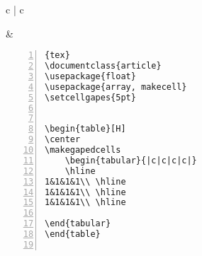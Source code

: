 \begin{tabular}{c | c}
\begin{minipage}[m]{0.4\textwidth}
\end{minipage}
&
\begin{minipage}[m]{0.55\textwidth}
\begin{lstlisting}[numberstyle=\zebra{green!15}{yellow!15},numbers=left,basicstyle=\footnotesize]{tex}
\documentclass{article}
\usepackage{float}
\usepackage{array, makecell}
\setcellgapes{5pt}


\begin{table}[H]
\center
\makegapedcells
    \begin{tabular}{|c|c|c|c|}
    \hline
1&1&1&1\\ \hline
1&1&1&1\\ \hline
1&1&1&1\\ \hline
 
\end{tabular}
\end{table}


\end{lstlisting}
\end{minipage}
\end{tabular}

